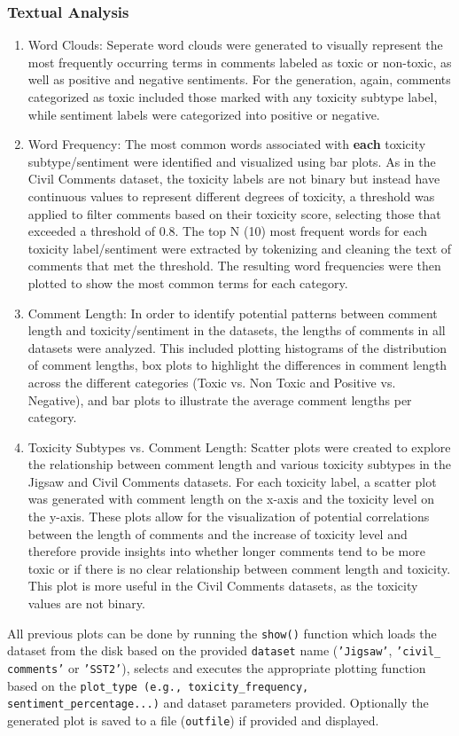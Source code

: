 \documentclass[10pt,a4paper,oneside]{article} %
\begin{document}
\subsubsection{Textual Analysis}
\begin{enumerate}
    \item Word Clouds: Seperate word clouds were generated to visually represent the most frequently occurring terms in comments labeled as toxic or non-toxic, as well as positive and negative sentiments. For the generation, again,  comments categorized as toxic included those marked with any toxicity subtype label, while sentiment labels were categorized into positive or negative. 
    \item Word Frequency: The most common words associated with \textbf{each} toxicity subtype/sentiment were identified and visualized using bar plots. As in the Civil Comments dataset, the toxicity labels are not binary but instead have continuous values to represent different degrees of toxicity, a threshold was applied to filter comments based on their toxicity score, selecting those that exceeded a threshold of 0.8. The top N (10)  most frequent words for each toxicity label/sentiment were extracted by tokenizing and cleaning the text of comments that met the threshold. The resulting word frequencies were then plotted to show the most common terms for each category. 
    \item Comment Length: In order to identify potential patterns between comment length and toxicity/sentiment in the datasets, the lengths of comments in all datasets were analyzed. This included plotting histograms of the distribution of comment lengths, box plots to highlight the differences in comment length across the different categories (Toxic vs. Non Toxic and Positive vs. Negative), and bar plots to illustrate the average comment lengths per category. 
    \item Toxicity Subtypes vs. Comment Length: Scatter plots were created to explore the relationship between comment length and various toxicity subtypes in the Jigsaw and Civil Comments datasets. For each toxicity label, a scatter plot was generated with comment length on the x-axis and the toxicity level on the y-axis. These plots allow for the visualization of potential correlations between the length of comments and the increase of toxicity level and therefore provide insights into whether longer comments tend to be more toxic or if there is no clear relationship between comment length and toxicity. This plot is more useful in the Civil Comments datasets, as the toxicity values are not binary. 
\end{enumerate}
All previous plots can be done by running the \texttt{show()} function which loads the dataset from the disk based on the provided \texttt{dataset} name (\texttt{'Jigsaw'}, \texttt{'civil\_ comments'} or \texttt{'SST2'}), selects and executes the appropriate plotting function based on the \texttt{plot\_type (e.g., toxicity\_frequency, sentiment\_percentage...)} and dataset parameters provided. Optionally the generated plot is saved to a file (\texttt{outfile}) if provided and displayed.
\end{document}
